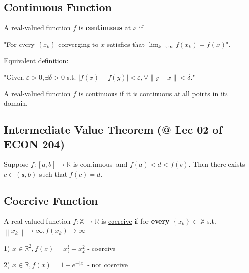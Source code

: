 \documentclass[11pt]{elegantbook}
\begin{document}
\subsection{Continuous Function}
\begin{definition}
    \normalfont
    A real-valued function $f$ is \underline{\textbf{continuous} at $x$} if
    
    "For every $\left\{x_{k}\right\}$ converging to $x$ satisfies that $\lim _{k \rightarrow \infty} f\left(x_{k}\right)=f(x)$".

    Equivalent definition:
    
    "Given $\varepsilon>0, \exists \delta>0$ s.t.
    $|f(x)-f(y)|<\varepsilon, \forall\|y-x\|<\delta$."
\end{definition}
\begin{definition}
    \normalfont
    A real-valued function $f$ is \underline{continuous} if it is continuous at all points in its domain.
\end{definition}

\subsection{Intermediate Value Theorem \small{(@ Lec 02 of ECON 204)}}
\begin{theorem}
    Suppose $f : [a, b] \rightarrow \mathbb{R}$ is continuous, and $f(a) < d < f(b)$. Then there exists $c \in (a, b)$ such that $f(c) = d$.
\end{theorem}

\subsection{Coercive Function}

\begin{definition}[Coercive]
    A real-valued function $f:\mathbb{X} \rightarrow \mathbb{R}$ is \underline{coercive} if for \textbf{every} $\left\{x_{k}\right\} \subset \mathbb{X}$ s.t. $\left\|x_{k}\right\| \rightarrow \infty, f\left(x_{k}\right) \rightarrow \infty$
\end{definition}

\begin{example}
\end{example}
1) $x \in \mathbb{R}^{2}, f(x)=x_{1}^{2}+x_{2}^{2}$ - coercive

2) $x \in \mathbb{R}, f(x)=1-e^{-|x|}$ - not coercive
\end{document}
